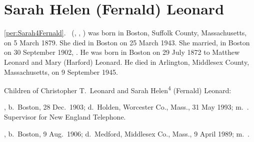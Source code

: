 \section{Sarah Helen (Fernald) Leonard}

\ref{per:Sarah4Fernald}.\  (, , ) was born in Boston, Suffolk County, Massachusetts, on 5 March 1879.\cite{Sarah4FernaldBirth} She died in Boston on 25 March 1943.\cite{Sarah4FernaldDeath} She married, in Boston on 30 September 1902, .\cite{Sarah4FernaldMarriage} He was born in Boston on 29 July 1872\cite{ChristopherLeonardBirth} to Matthew Leonard and Mary (Harford) Leonard.\cite{Sarah4FernaldMarriage} He died in Arlington, Middlesex County, Massachusetts, on 9 September 1945.\cite{ChristopherLeonardDeath}

\begin{KidsIntro}
	Children of Christopher T.\ Leonard and Sarah Helen\textsuperscript{4} (Fernald) Leonard:
\end{KidsIntro}

\begin{Kids}
	, b.\ Boston, 28 Dec.\ 1903;\cite{Mary5LeonardBirth} d.\ Holden, Worcester Co., Mass., 31 May 1993;\cite{Mary5LeonardDeath} m.\ .\cite{Mary5LeonardDeath} Supervisor for New England Telephone.\cite{Mary5LeonardDeath}
	
	, b.\ Boston, 9 Aug.\ 1906;\cite{George5LeonardBirth} d.\ Medford, Middlesex Co., Mass., 9 April 1989;\cite{George5LeonardDeath} m.\ .\cite{George5LeonardDeath}
\end{Kids}
